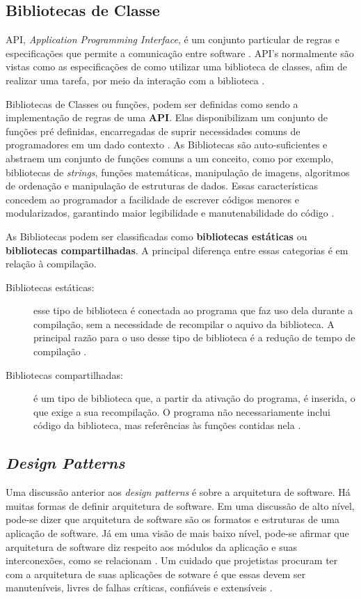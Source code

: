 \subsection{Bibliotecas de Classe}
API, \textit{Application Programming Interface}, é um conjunto particular de regras e especificações que permite a comunicação entre  software \cite{simsek2004}. API's normalmente são vistas como as especificações de como utilizar uma biblioteca de classes, afim de realizar uma tarefa, por meio da interação com a biblioteca \cite{simsek2004}.
\par
\indent Bibliotecas de Classes ou funções, podem ser definidas como sendo a implementação de regras de uma \textbf{API}. Elas disponibilizam um conjunto de funções pré definidas, encarregadas de suprir necessidades comuns de programadores em um dado contexto \cite{simsek2004}. As Bibliotecas são auto-suficientes e abstraem um conjunto de funções comuns a um conceito, como por exemplo, bibliotecas de \textit{strings}, funções matemáticas, manipulação de imagens, algoritmos de ordenação e manipulação de estruturas de dados. Essas características concedem ao programador a facilidade de escrever códigos menores e modularizados, garantindo maior legibilidade e manutenabilidade do código \cite{simsek2004}.
\par
\indent As Bibliotecas podem ser classificadas como \textbf{bibliotecas estáticas} ou \textbf{bibliotecas compartilhadas}. A principal diferença entre essas categorias é em relação à compilação.
\begin{description}
\item[Bibliotecas estáticas:] esse tipo de biblioteca é conectada ao programa que faz uso dela durante a compilação, sem a necessidade de recompilar o aquivo da biblioteca. A principal razão para o uso desse tipo de biblioteca é a redução de tempo de compilação \cite{simsek2004}.
\item[Bibliotecas compartilhadas:] é um tipo de biblioteca que, a partir da ativação do programa, é inserida, o que exige a sua recompilação. O programa não necessariamente inclui código da biblioteca, mas referências às funções contidas nela \cite{simsek2004}.
\end{description}

\subsection{\textit{Design Patterns}}
Uma discussão anterior aos \textit{design patterns} é sobre a arquitetura de software. Há muitas formas de definir arquitetura de software. Em uma discussão de alto nível, pode-se dizer que arquitetura de software são os formatos e estruturas de uma aplicação de software. Já em uma visão de mais baixo nível, pode-se afirmar que arquitetura de software diz respeito aos módulos da aplicação e suas interconexões, como se relacionam \cite{martin2000}. Um cuidado que projetistas procuram ter com a arquitetura de suas aplicações de sotware é que essas devem ser manuteníveis, livres de falhas críticas, confiáveis e extensíveis \cite{kleinWeiss2009}.

